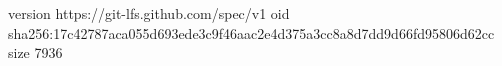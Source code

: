 version https://git-lfs.github.com/spec/v1
oid sha256:17c42787aca055d693ede3c9f46aac2e4d375a3cc8a8d7dd9d66fd95806d62cc
size 7936
